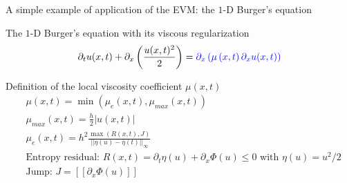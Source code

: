 \documentclass[xcolor=dvipsnames,10pt]{beamer}
\begin{document}
\begin{frame}{A simple example of application of the EVM: the $1$-D Burger's equation}
\begin{block}{The $1$-D Burger's equation with its viscous regularization}
\begin{equation}
\partial_t u(x,t) + \partial_x \left( \frac{u(x,t)^2}{2} \right) = \textcolor{blue}{\partial_x \left( \mu \left(x,t \right) \partial_x u(x,t) \right)} \nonumber
\end{equation}
\end{block}
\begin{block}{Definition of the local viscosity coefficient $\mu(x,t)$}
\begin{align}
&\mu(x,t) = \min \left( \mu_e(x,t), \mu_{max}(x,t) \right) \nonumber \\
&\mu_{max} (x,t) = \frac{h}{2} | u(x,t) | \nonumber \\
&\mu_e(x,t) = h^2 \frac{\max \left( R(x,t), J \right)}{|| \eta(u) - \bar{\eta}(t) ||_\infty} \nonumber \\
& \text{Entropy residual: }R(x,t) = \partial_t \eta(u) + \partial_x \Phi(u) \leq 0 \text{ with } \eta(u) = u^2 / 2 \nonumber \\
&\text{Jump: } J = [[ \partial_x \Phi(u) ]] \nonumber
\end{align}
\end{block}
\end{frame}
\end{document}
